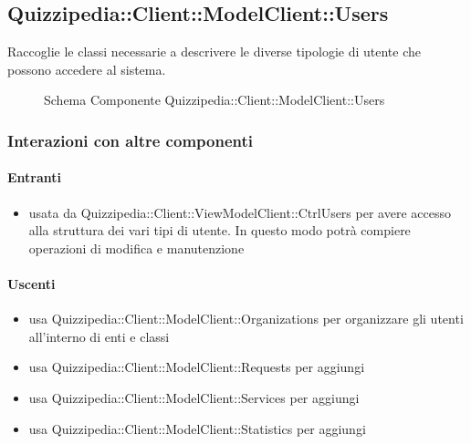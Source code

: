 \subsection{Quizzipedia::Client::ModelClient::Users}
Raccoglie le classi necessarie a descrivere le diverse tipologie di utente che possono accedere al sistema.
\begin{figure}[H]
\centering
\noindent{}
\caption[Schema Componente Quizzipedia::Client::ModelClient::Users]{Schema Componente Quizzipedia::Client::ModelClient::Users}
\end{figure}
\subsubsection{Interazioni con altre componenti}
\paragraph{Entranti}
\begin{itemize}
\item usata da Quizzipedia::Client::ViewModelClient::CtrlUsers per avere accesso alla struttura dei vari tipi di utente. In questo modo potrà compiere operazioni di modifica e manutenzione
\end{itemize}
\paragraph{Uscenti}
\begin{itemize}
\item usa Quizzipedia::Client::ModelClient::Organizations per organizzare gli utenti all'interno di enti e classi
\item usa Quizzipedia::Client::ModelClient::Requests per aggiungi
\item usa Quizzipedia::Client::ModelClient::Services per aggiungi
\item usa Quizzipedia::Client::ModelClient::Statistics per aggiungi
\end{itemize}

